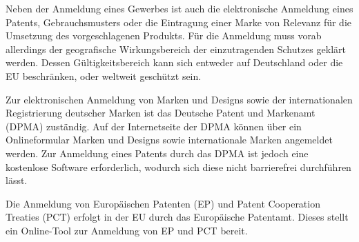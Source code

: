 
Neben der Anmeldung eines Gewerbes ist auch die elektronische Anmeldung eines Patents, Gebrauchsmusters oder die Eintragung einer 
Marke von Relevanz für die Umsetzung des vorgeschlagenen Produkts. Für die Anmeldung muss vorab allerdings der geografische Wirkungsbereich
der einzutragenden Schutzes geklärt werden. Dessen Gültigkeitsbereich kann sich entweder auf Deutschland oder die EU beschränken, oder 
weltweit geschützt sein.

Zur elektronischen Anmeldung von Marken und Designs sowie der internationalen Registrierung deutscher Marken ist das Deutsche Patent und Markenamt
(DPMA) zuständig. Auf der Internetseite der DPMA können über ein Onlineformular Marken und Designs sowie internationale Marken angemeldet werden.
Zur Anmeldung eines Patents durch das DPMA ist jedoch eine kostenlose Software erforderlich, wodurch sich diese nicht barrierefrei durchführen lässt.

Die Anmeldung von Europäischen Patenten (EP) und Patent Cooperation Treaties (PCT) erfolgt in der EU durch das Europäische Patentamt.
Dieses stellt ein Online-Tool zur Anmeldung von EP und PCT bereit.
